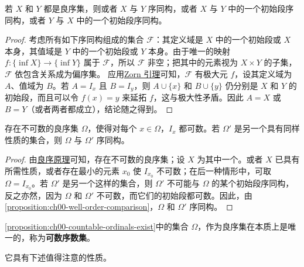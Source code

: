 \documentclass[../../main.tex]{subfiles}%
\begin{document}
\begin{proposition}\label{proposition:ch00-well-order-comparison}
若 $X$ 和 $Y$ 都是良序集，则或者 $X$ 与 $Y$ 序同构，或者 $X$ 与 $Y$ 中的一个初始段序同构，或者 $Y$ 与 $X$ 中的一个初始段序同构。
\end{proposition}

\begin{proof}
考虑所有如下序同构组成的集合 $\mathscr{F}$：其定义域是 $X$ 中的一个初始段或 $X$ 本身，其值域是 $Y$ 中的一个初始段或 $Y$ 本身。由于唯一的映射 $f:\{\inf X\}\to\{\inf Y\}$ 属于 $\mathscr{F}$，所以 $\mathscr{F}$ 非空；把其中的元素视为 $X\times Y$ 的子集，$\mathscr{F}$ 依包含关系成为偏序集。
应用\hyperref[lemma:ch00-zorn]{Zorn 引理}可知，$\mathscr{F}$ 有极大元 $f$，设其定义域为 $A$、值域为 $B$。若 $A=I_x$ 且 $B=I_y$，则 $A\cup\{x\}$ 和 $B\cup\{y\}$ 仍分别是 $X$ 和 $Y$ 的初始段，而且可以令 $f(x)=y$ 来延拓 $f$，这与极大性矛盾。因此 $A=X$ 或 $B=Y$（或者两者都成立），结论随之得到。
\end{proof}

\begin{proposition}\label{proposition:ch00-countable-ordinals-exist}
存在不可数的良序集 $\Omega$，使得对每个 $x\in\Omega$，$I_x$ 都可数。若 $\Omega'$ 是另一个具有同样性质的集合，则 $\Omega$ 与 $\Omega'$ 序同构。
\end{proposition}

\begin{proof}
由\hyperref[principle:ch00-well-ordering]{良序原理}可知，存在不可数的良序集；设 $X$ 为其中一个。或者 $X$ 已具有所需性质，或者存在最小的元素 $x_0$ 使 $I_{x_0}$ 不可数；在后一种情形中，可取 $\Omega=I_{x_0}$。若 $\Omega'$ 是另一个这样的集合，则 $\Omega'$ 不可能与 $\Omega$ 的某个初始段序同构，反之亦然，因为 $\Omega$ 和 $\Omega'$ 不可数，而它们的初始段都可数。因此，由\cref{proposition:ch00-well-order-comparison}，$\Omega$ 和 $\Omega'$ 序同构。
\end{proof}


\begin{definition}[可数序数集]\label{definition:ch00-countable-ordinals-definition}
\cref{proposition:ch00-countable-ordinals-exist}中的集合 $\Omega$，作为良序集在本质上是唯一的，称为\textbf{可数序数集}。
\end{definition}
它具有下述值得注意的性质。
\end{document}
